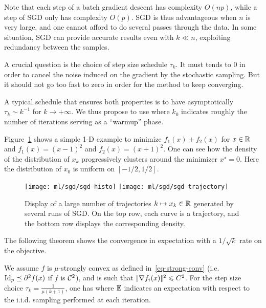 Note that each step of a batch gradient descent has complexity $O(np)$,
while a step of SGD only has complexity $O(p)$. SGD is thus
advantageous when $n$ is very large, and one cannot afford to do
several passes through the data. In some situation, SGD can provide
accurate results even with $k \ll n$, exploiting redundancy between
the samples.

A crucial question is the choice of step size schedule $\tau_k$. It
must tends to 0 in order to cancel the noise induced on the gradient by
the stochastic sampling. But it should not go too fast to zero in order
for the method to keep converging. 


A typical schedule that ensures both properties is to have asymptotically $\tau_k \sim k^{-1}$ for
$k\rightarrow +\infty$. We thus propose to use 
where $k_0$ indicates roughly the number of iterations serving as a
``warmup'' phase.

Figure~\ref{fig-sgd-traject} shows a simple 1-D example to minimize $f_1(x)+f_2(x)$ for $x \in \mathbb{R}$ and $f_1(x)=(x-1)^2$ and $f_2(x)=(x+1)^2$. One can see how the density of the distribution of $x_k$ progressively clusters around the minimizer $x^\star=0$. Here the distribution of $x_0$ is uniform on $[-1/2,1/2]$.

\begin{figure}
\centering
\texttt{[image: ml/sgd/sgd-histo]} 
\texttt{[image: ml/sgd/sgd-trajectory]}
\caption{\label{fig-sgd-traject}
Display of a large number of trajectories $k \mapsto x_k \in \mathbb{R}$ generated by several runs of SGD. On the top row, each curve is a trajectory, and the bottom row displays the corresponding density.
}
\end{figure}

The following theorem shows the convergence in expectation with a $1/\sqrt{k}$ rate on the objective.

\begin{thm}\label{thm-conv-sgd}
We assume $f$ is $\mu$-strongly convex as defined in~\eqref{eq-strong-conv} (i.e. $\mathrm{Id}_{p}  \preceq \partial^2  f(x)$ if $f$ is $\mathcal{C}^2$), and is such that $|\!| \nabla f_i(x) |\!|^2 \leqslant C^2$. 
For the step size choice $\tau_k = \frac{1}{\mu (k+1)}$, one has
where $\mathbb{E}$ indicates an expectation with respect to the i.i.d.
sampling performed at each iteration.
\end{thm}

